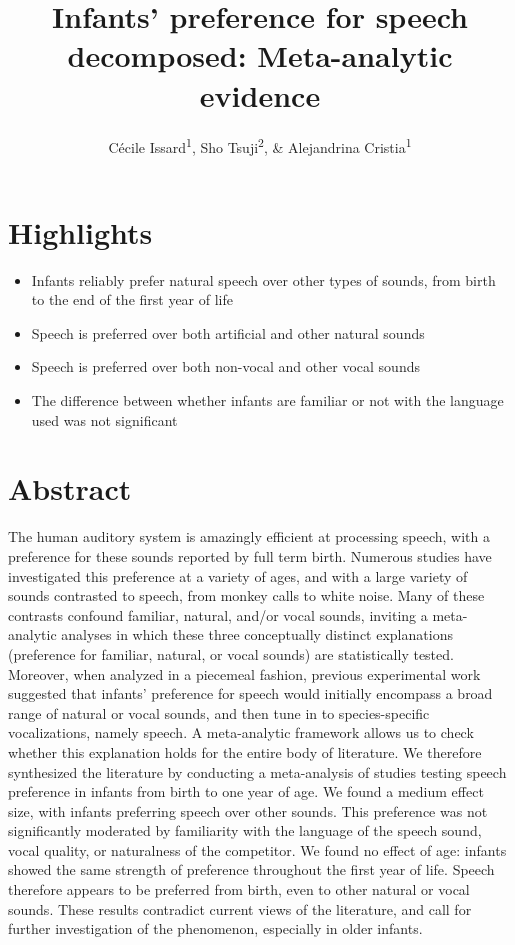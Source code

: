 \documentclass[man]{apa6}
\title{Infants' preference for speech decomposed: Meta-analytic evidence}
\author{Cécile Issard\textsuperscript{1}, Sho Tsuji\textsuperscript{2}, \&
Alejandrina Cristia\textsuperscript{1}}
\date{}
\affiliation{
\vspace{0.5cm}
\textsuperscript{1} Laboratoire de Sciences Cognitives et Psycholinguistique, Ecole Normale Supérieure, Département d'Études Cognitives\\\textsuperscript{2} International Research Center for Neurointelligence, The University of Tokyo}
\providecommand{\tightlist}{%
  \setlength{\itemsep}{0pt}\setlength{\parskip}{0pt}}
\begin{document}
\maketitle

\section{Highlights}\label{highlights}

\begin{itemize}
\tightlist
\item
  Infants reliably prefer natural speech over other types of sounds,
  from birth to the end of the first year of life
\item
  Speech is preferred over both artificial and other natural sounds
\item
  Speech is preferred over both non-vocal and other vocal sounds
\item
  The difference between whether infants are familiar or not with the
  language used was not significant
\end{itemize}

\section{Abstract}\label{abstract}

The human auditory system is amazingly efficient at processing speech,
with a preference for these sounds reported by full term birth. Numerous
studies have investigated this preference at a variety of ages, and with
a large variety of sounds contrasted to speech, from monkey calls to
white noise. Many of these contrasts confound familiar, natural, and/or
vocal sounds, inviting a meta-analytic analyses in which these three
conceptually distinct explanations (preference for familiar, natural, or
vocal sounds) are statistically tested. Moreover, when analyzed in a
piecemeal fashion, previous experimental work suggested that infants'
preference for speech would initially encompass a broad range of natural
or vocal sounds, and then tune in to species-specific vocalizations,
namely speech. A meta-analytic framework allows us to check whether this
explanation holds for the entire body of literature. We therefore
synthesized the literature by conducting a meta-analysis of studies
testing speech preference in infants from birth to one year of age. We
found a medium effect size, with infants preferring speech over other
sounds. This preference was not significantly moderated by familiarity
with the language of the speech sound, vocal quality, or naturalness of
the competitor. We found no effect of age: infants showed the same
strength of preference throughout the first year of life. Speech
therefore appears to be preferred from birth, even to other natural or
vocal sounds. These results contradict current views of the literature,
and call for further investigation of the phenomenon, especially in
older infants.
\end{document}
